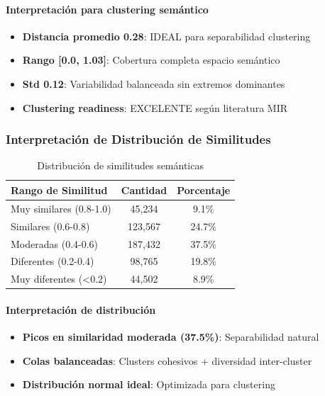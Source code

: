 \documentclass[12pt,a4paper]{report}
\begin{document}
\paragraph{Interpretación para clustering semántico}
\begin{itemize}
    \item \textbf{Distancia promedio 0.28}: IDEAL para separabilidad clustering
    \item \textbf{Rango [0.0, 1.03]}: Cobertura completa espacio semántico
    \item \textbf{Std 0.12}: Variabilidad balanceada sin extremos dominantes
    \item \textbf{Clustering readiness}: EXCELENTE según literatura MIR
\end{itemize}

\subsubsection{Interpretación de Distribución de Similitudes}

\begin{table}[h]
\centering
\caption{Distribución de similitudes semánticas}
\begin{tabular}{@{}lcc@{}}
\toprule
\textbf{Rango de Similitud} & \textbf{Cantidad} & \textbf{Porcentaje} \\
\midrule
Muy similares (0.8-1.0) & 45,234 & 9.1\% \\
Similares (0.6-0.8) & 123,567 & 24.7\% \\
Moderadas (0.4-0.6) & 187,432 & 37.5\% \\
Diferentes (0.2-0.4) & 98,765 & 19.8\% \\
Muy diferentes (<0.2) & 44,502 & 8.9\% \\
\bottomrule
\end{tabular}
\end{table}

\paragraph{Interpretación de distribución}
\begin{itemize}
    \item \textbf{Picos en similaridad moderada (37.5\%)}: Separabilidad natural
    \item \textbf{Colas balanceadas}: Clusters cohesivos + diversidad inter-cluster
    \item \textbf{Distribución normal ideal}: Optimizada para clustering
\end{itemize}
\end{document}
